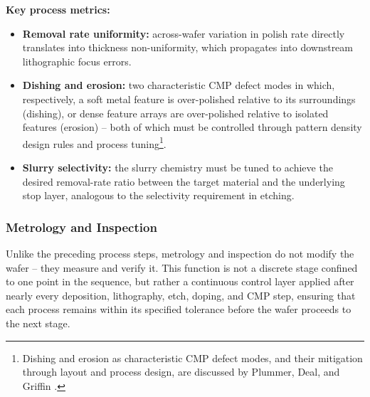 \documentclass[10pt,a4paper]{article}
\begin{document}
\textbf{Key process metrics:}
\begin{itemize}
    \item \textbf{Removal rate uniformity:} across-wafer variation in polish 
    rate directly translates into thickness non-uniformity, which propagates 
    into downstream lithographic focus errors.
    \item \textbf{Dishing and erosion:} two characteristic CMP defect modes in 
    which, respectively, a soft metal feature is over-polished relative to its 
    surroundings (dishing), or dense feature arrays are over-polished relative 
    to isolated features (erosion) -- both of which must be controlled through 
    pattern density design rules and process 
    tuning\footnote{Dishing and erosion as characteristic CMP defect modes, and 
    their mitigation through layout and process design, are discussed by 
    Plummer, Deal, and Griffin \cite{plummer2000}.}.
    \item \textbf{Slurry selectivity:} the slurry chemistry must be tuned to 
    achieve the desired removal-rate ratio between the target material and the 
    underlying stop layer, analogous to the selectivity requirement in etching.
\end{itemize}

\subsubsection{Metrology and Inspection}

Unlike the preceding process steps, metrology and inspection do not modify the 
wafer -- they measure and verify it. This function is not a discrete stage 
confined to one point in the sequence, but rather a continuous control layer 
applied after nearly every deposition, lithography, etch, doping, and CMP step, 
ensuring that each process remains within its specified tolerance before the 
wafer proceeds to the next stage.
\end{document}
